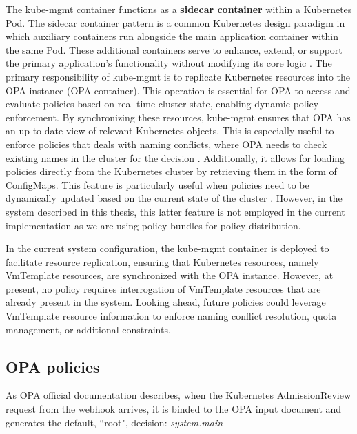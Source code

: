 The kube-mgmt container functions as a \textbf{sidecar container} within a Kubernetes Pod. The sidecar container pattern is a common Kubernetes design paradigm in which auxiliary containers run alongside the main application container within the same Pod. These additional containers serve to enhance, extend, or support the primary application's functionality without modifying its core logic \cite{sidecar_containers}. 
The primary responsibility of kube-mgmt is to replicate Kubernetes resources into the OPA instance (OPA container). This operation is essential for OPA to access and evaluate policies based on real-time cluster state, enabling dynamic policy enforcement. By synchronizing these resources, kube-mgmt ensures that OPA has an up-to-date view of relevant Kubernetes objects.
This is especially useful to enforce policies that deals with naming conflicts, where OPA needs to check existing names in the cluster for the decision \cite{kube-mgmt}.
Additionally, it allows for loading policies directly from the Kubernetes cluster by retrieving them in the form of ConfigMaps. This feature is particularly useful when policies need to be dynamically updated based on the current state of the cluster \cite{kube-mgmt}. However, in the system described in this thesis, this latter feature is not employed in the current implementation as we are using policy bundles for policy distribution.

In the current system configuration, the kube-mgmt container is deployed to facilitate resource replication, ensuring that Kubernetes resources, namely VmTemplate resources, are synchronized with the OPA instance. However, at present, no policy requires interrogation of VmTemplate resources that are already present in the system.
Looking ahead, future policies could leverage VmTemplate resource information to enforce naming conflict resolution, quota management, or additional constraints.

\newpage

\subsection{OPA policies}
\label{sec:opa_policies}






As OPA official documentation describes, when the Kubernetes AdmissionReview request from the webhook arrives, it is binded to the OPA input document and generates the default, ``root", decision: \textit{system.main}

